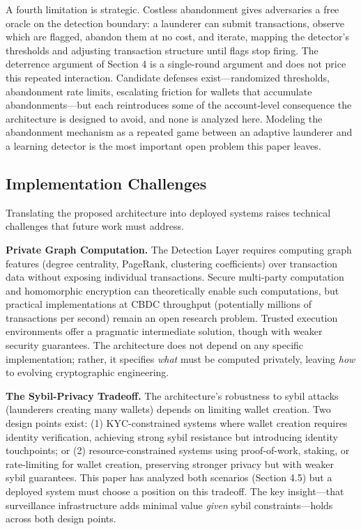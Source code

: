 \documentclass[11pt]{article}
\begin{document}
A fourth limitation is strategic. Costless abandonment gives adversaries a free oracle on the detection boundary: a launderer can submit transactions, observe which are flagged, abandon them at no cost, and iterate, mapping the detector's thresholds and adjusting transaction structure until flags stop firing. The deterrence argument of Section 4 is a single-round argument and does not price this repeated interaction. Candidate defenses exist---randomized thresholds, abandonment rate limits, escalating friction for wallets that accumulate abandonments---but each reintroduces some of the account-level consequence the architecture is designed to avoid, and none is analyzed here. Modeling the abandonment mechanism as a repeated game between an adaptive launderer and a learning detector is the most important open problem this paper leaves.

\subsection{Implementation Challenges}

Translating the proposed architecture into deployed systems raises technical challenges that future work must address.

\textbf{Private Graph Computation.} The Detection Layer requires computing graph features (degree centrality, PageRank, clustering coefficients) over transaction data without exposing individual transactions. Secure multi-party computation and homomorphic encryption can theoretically enable such computations, but practical implementations at CBDC throughput (potentially millions of transactions per second) remain an open research problem. Trusted execution environments offer a pragmatic intermediate solution, though with weaker security guarantees. The architecture does not depend on any specific implementation; rather, it specifies \textit{what} must be computed privately, leaving \textit{how} to evolving cryptographic engineering.

\textbf{The Sybil-Privacy Tradeoff.} The architecture's robustness to sybil attacks (launderers creating many wallets) depends on limiting wallet creation. Two design points exist: (1) KYC-constrained systems where wallet creation requires identity verification, achieving strong sybil resistance but introducing identity touchpoints; or (2) resource-constrained systems using proof-of-work, staking, or rate-limiting for wallet creation, preserving stronger privacy but with weaker sybil guarantees. This paper has analyzed both scenarios (Section 4.5) but a deployed system must choose a position on this tradeoff. The key insight---that surveillance infrastructure adds minimal value \textit{given} sybil constraints---holds across both design points.
\end{document}
